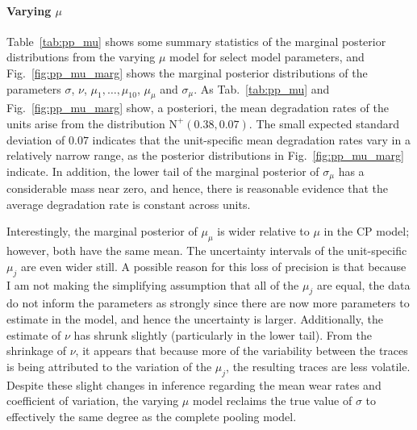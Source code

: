 \paragraph{Varying $\mu$} Table~\ref{tab:pp_mu} shows some summary statistics of the marginal posterior distributions from the varying $\mu$ model for select model parameters, and Fig.~\ref{fig:pp_mu_marg} shows the marginal posterior distributions of the parameters $\sigma$, $\nu$, $\mu_1, \ldots, \mu_{10}$, $\mu_{\mu}$ and $\sigma_{\mu}$. As Tab.~\ref{tab:pp_mu} and Fig.~\ref{fig:pp_mu_marg} show, a posteriori, the mean degradation rates of the units arise from the distribution $\mbox{N}^{+}(0.38, 0.07)$. The small expected standard deviation of $0.07$ indicates that the unit-specific mean degradation rates vary in a relatively narrow range, as the posterior distributions in Fig.~\ref{fig:pp_mu_marg} indicate. In addition, the lower tail of the marginal posterior of $\sigma_\mu$ has a considerable mass near zero, and hence, there is reasonable evidence that the average degradation rate is constant across units. 

Interestingly, the marginal posterior of $\mu_\mu$ is wider relative to $\mu$ in the CP model; however, both have the same mean. The uncertainty intervals of the unit-specific $\mu_j$ are even wider still. A possible reason for this loss of precision is that because I am not making the simplifying assumption that all of the $\mu_j$ are equal, the data do not inform the parameters as strongly since there are now more parameters to estimate in the model, and hence the uncertainty is larger. Additionally, the estimate of $\nu$ has shrunk slightly (particularly in the lower tail). From the shrinkage of $\nu$, it appears that because more of the variability between the traces is being attributed to the variation of the $\mu_j$, the resulting traces are less volatile. Despite these slight changes in inference regarding the mean wear rates and coefficient of variation, the varying $\mu$ model reclaims the true value of $\sigma$ to effectively the same degree as the complete pooling model.



